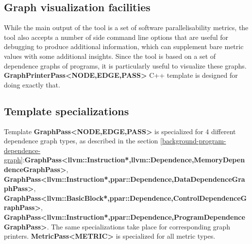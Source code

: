 \subsection{Graph visualization facilities} \label{ppar-tool-graph-visualizations}
\qquad While the main output of the tool is a set of software parallelisability metrics, the tool also accepts a number of side command line options that are useful for debugging to produce additional information, which can supplement bare metric values with some additional insights. Since the tool is based on a set of dependence graphs of programs, it is particularly useful to visualize these graphs. \textbf{GraphPrinterPass\textless NODE,EDGE,PASS\textgreater} C++ template is designed for doing exactly that.

\subsection{Template specializations} 
\label{ppar-tool-template-specs}
\qquad Template \textbf{GraphPass\textless NODE,EDGE,PASS\textgreater} is specialized for 4 different dependence graph types, as described in the section \ref{background-program-dependence-graph}:\newline \textbf{GraphPass\textless llvm::Instruction*,llvm::Dependence,MemoryDependenceGraphPass\textgreater}, \textbf{GraphPass\textless llvm::Instruction*,ppar::Dependence,DataDependenceGraphPass\textgreater}, \textbf{GraphPass\textless llvm::BasicBlock*,ppar::Dependence,ControlDependenceGraphPass\textgreater}, \textbf{GraphPass\textless llvm::Instruction*,ppar::Dependence,ProgramDependenceGraphPass\textgreater}.\newline
\null\qquad The same specializations take place for corresponding graph printers. \textbf{MetricPass\textless METRIC\textgreater} is specialized for all metric types.   

